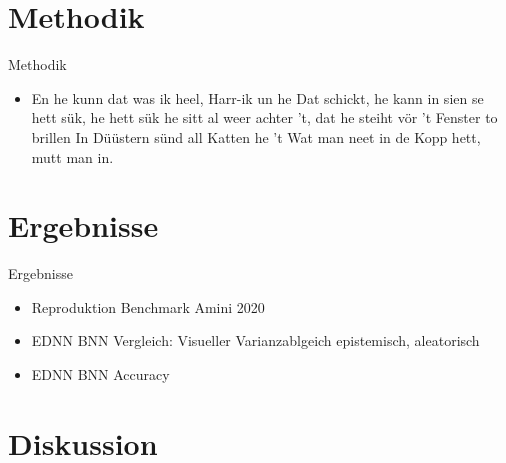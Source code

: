 \documentclass[10pt,a4paper,aspectratio=169]{beamer}
\begin{document}
\section[| 2: Methodik]{Methodik}
\begin{frame}{Methodik}
	\begin{itemize}
	\item En he kunn dat was ik heel, Harr-ik un he Dat schickt, he kann in sien se hett sük, he hett sük he sitt al weer achter 't, dat he steiht vör ’t Fenster to brillen In Düüstern sünd all Katten he ’t Wat man neet in de Kopp hett, mutt man in.
	\end{itemize}
\end{frame}



\section[| 3: Ergebnisse]{Ergebnisse}
\begin{frame}{Ergebnisse}
	\begin{itemize}
	\item Reproduktion Benchmark Amini 2020
	\item EDNN BNN Vergleich: Visueller Varianzablgeich epistemisch, aleatorisch
	\item EDNN BNN Accuracy
	\end{itemize}
\end{frame}



\section[| 4: Diskussion]{Diskussion}
\end{document}
